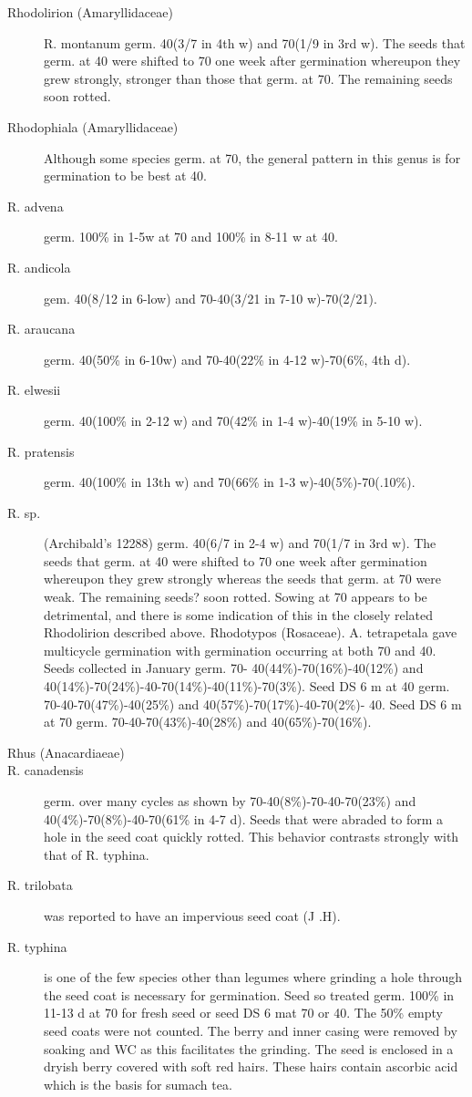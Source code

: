 \begin{description}
\item[Rhodolirion (Amaryllidaceae)] R. montanum germ. 40(3/7 in 4th w) and
70(1/9 in 3rd w). The seeds that germ. at 40 were shifted to 70 one week after
germination whereupon they grew strongly, stronger than those that germ. at 70. The
remaining seeds soon rotted.
\item[Rhodophiala (Amaryllidaceae)] Although some species germ. at 70, the
general pattern in this genus is for germination to be best at 40.
\item[R. advena] germ. 100\% in 1-5w at 70 and 100\% in 8-11 w at 40.
\item[R. andicola] gem. 40(8/12 in 6-low) and 70-40(3/21 in 7-10 w)-70(2/21).
\item[R. araucana] germ. 40(50\% in 6-10w) and 70-40(22\% in 4-12 w)-70(6\%, 4th d).
\item[R. elwesii] germ. 40(100\% in 2-12 w) and 70(42\% in 1-4 w)-40(19\% in 5-10 w).
\item[R. pratensis] germ. 40(100\% in 13th w) and 70(66\% in 1-3 w)-40(5\%)-70(.10\%).
\item[R. sp.] (Archibald's 12288) germ. 40(6/7 in 2-4 w) and 70(1/7 in 3rd w). The
seeds that germ. at 40 were shifted to 70 one week after germination whereupon they
grew strongly whereas the seeds that germ. at 70 were weak. The remaining seeds?
soon rotted. Sowing at 70 appears to be detrimental, and there is some indication of
this in the closely related Rhodolirion described above.
Rhodotypos (Rosaceae). A. tetrapetala gave multicycle germination with
germination occurring at both 70 and 40. Seeds collected in January germ. 70-
40(44\%)-70(16\%)-40(12\%) and 40(14\%)-70(24\%)-40-70(14\%)-40(11\%)-70(3\%).
Seed DS 6 m at 40 germ. 70-40-70(47\%)-40(25\%) and 40(57\%)-70(17\%)-40-70(2\%)-
40. Seed DS 6 m at 70 germ. 70-40-70(43\%)-40(28\%) and 40(65\%)-70(16\%).

\item[Rhus (Anacardiaeae)]
\item[R. canadensis] germ. over many cycles as shown by 70-40(8\%)-70-40-70(23\%)
and 40(4\%)-70(8\%)-40-70(61\% in 4-7 d). Seeds that were abraded to form a hole in
the seed coat quickly rotted. This behavior contrasts strongly with that of R. typhina.
\item[R. trilobata] was reported to have an impervious seed coat (J .H).
\item[R. typhina] is one of the few species other than legumes where grinding a hole
through the seed coat is necessary for germination. Seed so treated germ. 100\% in
11-13 d at 70 for fresh seed or seed DS 6 mat 70 or 40. The 50\% empty seed coats
were not counted. The berry and inner casing were removed by soaking and WC as
this facilitates the grinding. The seed is enclosed in a dryish berry covered with soft red
hairs. These hairs contain ascorbic acid which is the basis for sumach tea.


\end{description}
